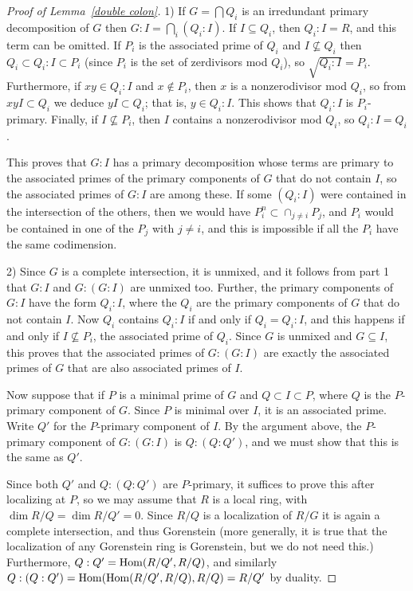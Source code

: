 \begin{proof}[Proof of Lemma~\ref{double colon}]
 1) If $G = \bigcap Q_{i}$ is an irredundant primary decomposition of $G$ then
$G:I = \bigcap_i (Q_{i}:I)$. If $I \subseteq Q_i$, then $Q_{i}:I = R$, and this term can be omitted. If $P_i$ is the associated prime of $Q_i$
and $I \not\subseteq Q_i$ then $ Q_i \subset Q_i:I\subset P_i$ (since $P_i$ is the set of zerdivisors mod $Q_i$), 
so $\sqrt {Q_i:I} = P_i$. Furthermore, if $xy\in Q_i:I$ and $x\notin P_i$, then $x$ is a nonzerodivisor mod $Q_i$, so from
$xyI\subset Q_i$ we deduce $yI\subset Q_i$; that is, $y\in Q_i:I$. This shows that $Q_i:I$ is $P_i$-primary. 
Finally, if $I\not\subseteq P_i$, then $I$ contains a nonzerodivisor mod $Q_i$, so $Q_i:I = Q_i$.

This proves that $G:I$ has a primary decomposition whose terms are primary to the associated primes of the primary
components of $G$ that do not contain $I$, so the associated primes of $G:I$ are among these. If some $(Q_i:I)$ were contained
in the intersection of the others, then we would have $P_i^n \subset \cap_{j\neq i}P_j$, and $P_i$ would be contained in one
of the $P_j$ with $j\neq i$, and this is impossible if all the $P_i$ have the same codimension.
 
 2) Since $G$ is a complete intersection, it is unmixed, and it follows from part 1 that $G:I$ and $G:(G:I)$ are unmixed too. Further,
 the primary components of $G:I$ have the form $Q_i:I$, where the $Q_i$ are the primary components of $G$ that
 do not contain $I$. Now $Q_i$ contains $Q_i:I$ if and only if $Q_i=Q_i:I$, and this happens if and only if
  $I\not\subseteq P_i$,  the associated prime of $Q_i$. Since $G$ is unmixed and $G\subseteq I$, this proves that the associated primes of 
  $G:(G:I)$ are exactly the associated primes of $G$ that are also associated primes of $I$.
  
 Now suppose that if $P$ is a minimal prime of $G$ and $Q \subset I \subset P$, where $Q$ is the $P$-primary
  component of $G$. Since $P$ is minimal over $I$, it is an associated prime. Write $Q'$ for the $P$-primary component
  of $I$. By the argument above, the $P$-primary component of $G:(G:I)$ is $Q:(Q:Q')$, and we must show that this is the
  same as $Q'$.
  
  Since both $Q'$ and $Q:(Q:Q')$ are $P$-primary, it suffices to prove this after localizing at $P$, so we may assume
  that $R$ is a local ring, with $\dim R/Q = \dim R/Q' = 0$. Since $R/Q$ is a localization of $R/G$ it is again a complete
  intersection, and thus Gorenstein (more generally, it is true that the localization of any Gorenstein ring is Gorenstein, but
  we do not need this.)
  Furthermore, $Q:Q' = \operatorname{Hom}(R/Q', R/Q)$, and similarly $Q:(Q:Q') = \operatorname{Hom}(\operatorname{Hom}(R/Q', R/Q), R/Q) = R/Q'$ by duality.
  

\end{proof}
